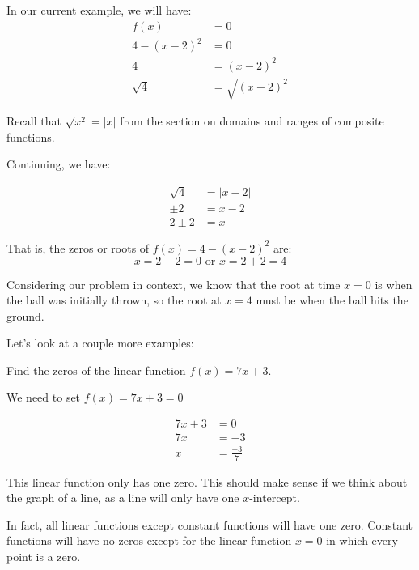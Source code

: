 \documentclass[nooutcomes]{ximera}
\begin{document}
\begin{example}
\begin{explanation}
In our current example, we will have:
\begin{align*}
f(x)&=0\\
4-(x-2)^2&=0 \\
4&=(x-2)^2 \\
 \sqrt{4}&=\sqrt{(x-2)^2}
\end{align*}  

Recall that $\sqrt{x^2}=|x|$ from the section on domains and ranges of composite functions.

Continuing, we have:

\begin{align*}
\sqrt{4}&= |x-2|\\
\pm 2&= x-2\\
2\pm 2&= x
\end{align*}  

That is, the zeros or roots of $f(x)=4-(x-2)^2$  are:
$$
x=2-2=0 \text{ or } x=2+2=4
$$

Considering our problem in context, we know that the root at time $x=0$ is when the ball was initially thrown, so the root at $x=4$ must be when the ball hits the ground.

\end{explanation}

\end{example}

Let's look at a couple more examples:

\begin{example}
Find the zeros of the linear function $f(x)=7x+3$.

\begin{explanation}
We need to set $f(x)=7x+3=0$

\begin{align*}
7x+3&=0\\
7x&=-3\\
x&=\tfrac{-3}{7}
\end{align*}  

This linear function only has one zero.  This should make sense if we think about the graph of a line, as a line will only have one $x$-intercept.

\begin{image}
\end{image}

In fact, all linear functions except constant functions will have one zero.  Constant functions will have no zeros except for the linear function $x=0$ in which every point is a zero.
\end{explanation}
\end{example}
\end{document}

